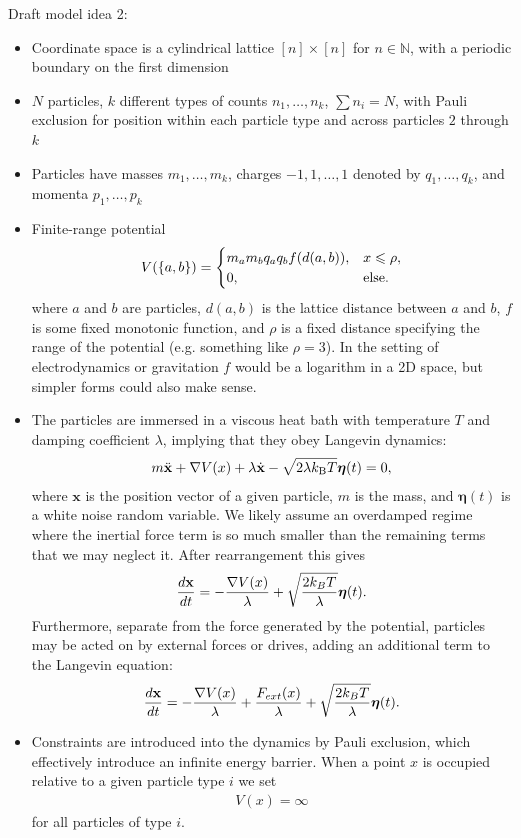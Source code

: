 \documentclass[12pt,letterpaper]{article}
\begin{document}
Draft model idea 2:
\begin{itemize}
\item Coordinate space is a cylindrical lattice $[n] \times [n]$ for $n \in \mathbb{N}$, with a periodic boundary on the first dimension
\item $N$ particles, $k$ different types of counts $n_{1}, \ldots, n_{k}$, $\sum n_{i} = N$, with Pauli exclusion for position within each particle type and across particles $2$ through $k$
\item Particles have masses $m_{1}, \ldots, m_{k}$, charges $-1, 1, \ldots, 1$ denoted by $q_{1}, \ldots, q_{k}$, and momenta $p_{1}, \ldots, p_{k}$
\item Finite-range potential
\begin{align*}
V(\{a, b\}) = \begin{cases}
m_{a}m_{b}q_{a}q_{b}f(d(a, b)), &x \leqslant \rho, \\
0, &\textnormal{else}.
\end{cases}
\end{align*}
where $a$ and $b$ are particles, $d(a, b)$ is the lattice distance between $a$ and $b$, $f$ is some fixed monotonic function, and $\rho$ is a fixed distance specifying the range of the potential (e.g. something like $\rho = 3$). In the setting of electrodynamics or gravitation $f$ would be a logarithm in a 2D space, but simpler forms could also make sense.
\item The particles are immersed in a viscous heat bath with temperature $T$ and damping coefficient $\lambda$, implying that they obey Langevin dynamics:
\begin{align*}
m\ddot{\mathbf{x}} + \nabla V(x) + \lambda\dot{\mathbf{x}} - \sqrt{2\lambda k_{\textnormal{B}}T}\boldsymbol{\eta}(t) = 0,
\end{align*}
where $\mathbf{x}$ is the position vector of a given particle, $m$ is the mass, and $\boldsymbol{\eta}(t)$ is a white noise random variable. We likely assume an overdamped regime where the inertial force term is so much smaller than the remaining terms that we may neglect it. After rearrangement this gives
\begin{align*}
{d\mathbf{x} \over dt} = -{\nabla V(x) \over \lambda} + \sqrt{2 k_{B}T\over \lambda}\boldsymbol{\eta}(t).
\end{align*}
Furthermore, separate from the force generated by the potential, particles may be acted on by external forces or drives, adding an additional term to the Langevin equation:
\begin{align*}
{d\mathbf{x} \over dt} = -{\nabla V(x) \over \lambda} + {F_{ext}(x) \over \lambda} + \sqrt{2 k_{B}T\over \lambda}\boldsymbol{\eta}(t).
\end{align*}
\item Constraints are introduced into the dynamics by Pauli exclusion, which effectively introduce an infinite energy barrier. When a point $x$ is occupied relative to a given particle type $i$ we set
\begin{align*}
V(x) = \infty
\end{align*}
for all particles of type $i$.
\end{itemize}
\end{document}
